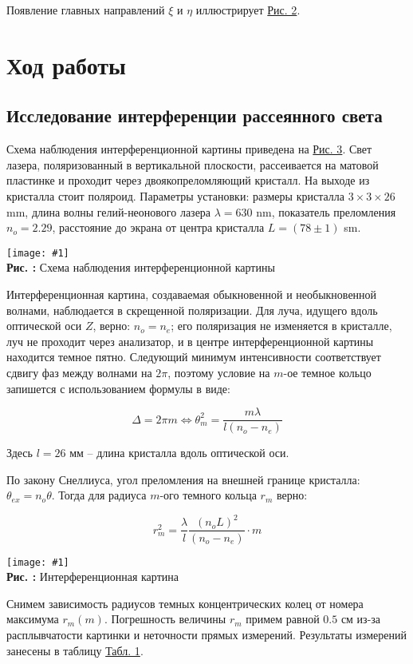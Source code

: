 \documentclass[12pt,a4paper]{article}
\newcounter{picture}
\newcounter{tbl}
\newcommand{\embed}[3]{\begin{center}
		\texttt{[image: \#1]}
		\\\textbf{Рис. \thepicture:} #3
		\label{pic_\thepicture}
		\addtocounter{picture}{1}
\end{center}}
\newcommand{\picref}[1]{\hyperref[pic_#1]{Рис. #1}}
\newcommand{\tblref}[1]{\hyperref[tbl_#1]{Табл. #1}}
\begin{document}
	Появление главных направлений $\xi$ и $\eta$ иллюстрирует \picref{2}.
	
	\section{Ход работы}
	
	\subsection{Исследование интерференции рассеянного света}
	
	Схема наблюдения интерференционной картины приведена на \picref{3}. Свет лазера, поляризованный в вертикальной плоскости, рассеивается на матовой пластинке и проходит через двоякопреломляющий кристалл. На выходе из кристалла стоит поляроид. Параметры установки: размеры кристалла $3 \times 3 \times 26$ mm, длина волны гелий-неонового лазера $\lambda = 630$ nm, показатель преломления $n_o = 2.29$, расстояние до экрана от центра кристалла $L = (78 \pm 1)$ sm.
	
	\embed{PIC_3.png}{0.2}{Схема наблюдения интерференционной картины}
	
	Интерференционная картина, создаваемая обыкновенной и необыкновенной волнами, наблюдается в скрещенной поляризации. Для луча, идущего вдоль оптической оси $Z$, верно: $n_o = n_e$; его поляризация не изменяется в кристалле, луч не проходит через анализатор, и в центре интерференционной картины находится темное пятно. Следующий минимум интенсивности соответствует сдвигу фаз между волнами на $2\pi$, поэтому условие на $m$-ое темное кольцо запишется с использованием формулы в виде:
	
	$$ \Delta = 2\pi m \Longleftrightarrow \theta_m^2 = \frac{m\lambda}{l(n_o - n_e)} $$
	
	Здесь $l = 26$ мм -- длина кристалла вдоль оптической оси.
	
	По закону Снеллиуса, угол преломления на внешней границе кристалла: $\theta_{ex} = n_o\theta$. Тогда для радиуса $m$-ого темного кольца $r_m$ верно: 
	
	$$ r_m^2 = \frac{\lambda}{l} \frac{(n_oL)^2}{(n_o - n_e)} \cdot m $$
	
	\embed{PIC_4.png}{0.1}{Интерференционная картина}
	
	Снимем зависимость радиусов темных концентрических колец от номера максимума $r_m(m)$. Погрешность величины $r_m$ примем равной $0.5$ см из-за расплывчатости картинки и неточности прямых измерений. Результаты измерений занесены в таблицу \tblref{1}. 
	
\end{document}
